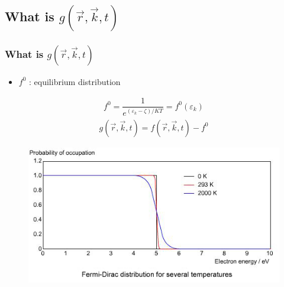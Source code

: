 \documentclass{beamer}
\begin{document}
\subsection{What is $g (\vec{r},\vec{k},t)$}
\begin{frame}
\frametitle{What is $g (\vec{r},\vec{k},t)$}
\pause
\begin{itemize}
\item $f^0$ : equilibrium distribution
\end{itemize}
\pause
\begin{align*}
f^0 = \dfrac{1}{e^{(\varepsilon_k -\zeta)/KT}} = f^0 (\varepsilon_k)
\end{align*}
\pause
\begin{align*}
g (\vec{r},\vec{k},t) = f (\vec{r},\vec{k},t) - f^0
\end{align*}
\pause
\begin{figure}[h]
\centering
\includegraphics[scale=.3]{fermiDirac}
\end{figure}
\end{frame}
\end{document}
